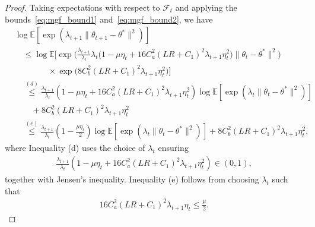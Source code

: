 \documentclass[11 pt]{article}
\begin{document}
\begin{proof}
Taking expectations with respect to $\mathcal{F}_t$ and applying the bounds~\eqref{eq:mgf_bound1} and~\eqref{eq:mgf_bound2}, we have
\begin{align}
    &\log\mathbb{E}[\exp(\lambda_{t+1} \|\theta_{t+1}-\theta^*\|^2)] \nonumber\\
    &\quad \le \log \mathbb{E}\!\Bigg[
   \exp\!\Bigg(
   \frac{\lambda_{t+1}}{\lambda_t}\lambda_t
   \big(1-\mu \eta_t + 16 C_a^2 (LR+C_1)^2 \lambda_{t+1}\eta_t^2\big)
   \|\theta_t-\theta^*\|^2
   \Bigg) \nonumber \\
&\quad \quad \quad \quad \times \exp\!\big(8 C_b^2 (LR+C_1)^2 \lambda_{t+1}\eta_t^2\big)
\Bigg] \nonumber\\
& \quad\overset{(d)}{\leq} \frac{\lambda_{t+1}}{\lambda_t}(1-\mu\eta_t+16C_a^2(LR+C_1)^2\lambda_{t+1}\eta_t^2)\log\mathbb{E}[\exp(\lambda_t\|\theta_t-\theta^*\|^2)] \nonumber\\
& \quad \quad +8C_b^2(LR+C_1)^2\lambda_{t+1}\eta_t^2 \nonumber\\
& \quad \overset{(e)}{\leq} \frac{\lambda_{t+1}}{\lambda_t}\left(1-\frac{\mu\eta_t}{2}\right)\log\mathbb{E}[\exp(\lambda_t\|\theta_t-\theta^*\|^2)]+8C_b^2(LR+C_1)^2\lambda_{t+1}\eta_t^2,\label{eq:mgf_sgd_error2}
\end{align}
where Inequality (d) uses the choice of $\lambda_t$ ensuring 
\begin{align}\label{eq:lambda_1}
    \frac{\lambda_{t+1}}{\lambda_t}(1-\mu\eta_t+16C_a^2(LR+C_1)^2\lambda_{t+1}\eta_t^2)\in (0,1),
\end{align}
together with Jensen’s inequality. Inequality (e) follows from choosing $\lambda_t$ such that 
\begin{align}\label{eq:lambda_2}
    16C_a^2(LR+C_1)^2\lambda_{t+1}\eta_t\leq \frac{\mu}{2}.
\end{align}


\end{proof}
\end{document}
